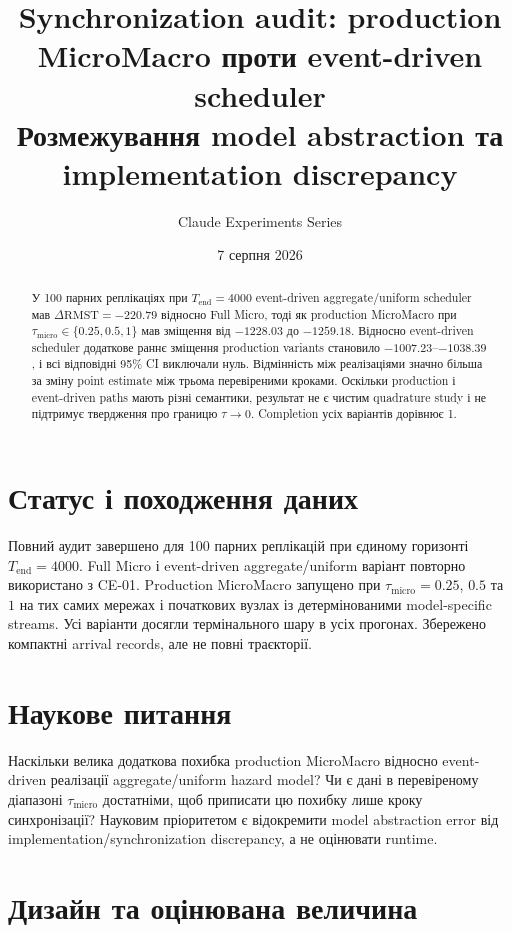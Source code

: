 \documentclass[11pt,a4paper]{article}
\title{\textbf{Synchronization audit: production MicroMacro проти event-driven scheduler}\\[0.4em]
\large Розмежування model abstraction та implementation discrepancy}
\author{Claude Experiments Series}
\date{7 серпня 2026}
\begin{document}
\sloppy
\maketitle

\begin{abstract}
У 100 парних реплікаціях при $T_{\mathrm{end}}=4000$ event-driven
aggregate/uniform scheduler мав $\Delta\mathrm{RMST}=-220.79$ відносно Full
Micro, тоді як production MicroMacro при
$\tau_{\mathrm{micro}}\in\{0.25,0.5,1\}$ мав зміщення від $-1228.03$ до
$-1259.18$. Відносно event-driven scheduler додаткове раннє зміщення
production variants становило $-1007.23$--$-1038.39$, і всі відповідні 95\%
CI виключали нуль. Відмінність між реалізаціями значно більша за зміну point
estimate між трьома перевіреними кроками. Оскільки production і event-driven
paths мають різні семантики, результат не є чистим quadrature study і не
підтримує твердження про границю $\tau\to0$. Completion усіх варіантів дорівнює 1.
\end{abstract}

\tableofcontents
\clearpage

\section{Статус і походження даних}\label{sec:status}

Повний аудит завершено для 100 парних реплікацій при єдиному горизонті
$T_{\mathrm{end}}=4000$. Full Micro і event-driven aggregate/uniform варіант
повторно використано з CE-01. Production MicroMacro запущено при
$\tau_{\mathrm{micro}}=0.25$, $0.5$ та $1$ на тих самих мережах і початкових
вузлах із детермінованими model-specific streams. Усі варіанти досягли
термінального шару в усіх прогонах. Збережено компактні arrival records,
але не повні траєкторії.

\section{Наукове питання}\label{sec:question}

Наскільки велика додаткова похибка production MicroMacro відносно event-driven
реалізації aggregate/uniform hazard model? Чи є дані в перевіреному діапазоні
$\tau_{\mathrm{micro}}$ достатніми, щоб приписати цю похибку лише кроку
синхронізації? Науковим пріоритетом є відокремити model abstraction error від
implementation/synchronization discrepancy, а не оцінювати runtime.

\section{Дизайн та оцінювана величина}\label{sec:design}
\end{document}
